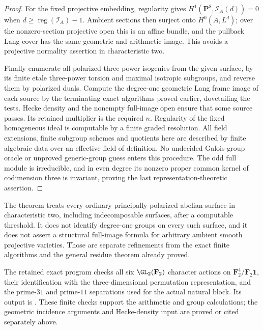 \begin{proof}
For the fixed projective embedding, regularity gives
$H^1(\mathbf P^8,\mathcal I_A(d))=0$ when
$d\ge\operatorname{reg}(\mathcal I_A)-1$.
Ambient sections then surject onto $H^0(A,L^d)$; over the nonzero-section
projective open this is an affine bundle, and the pullback Lang cover
has the same geometric and arithmetic image. This avoids a projective
normality assertion in characteristic two.

Finally enumerate all polarized three-power isogenies from the given
surface, by its finite etale three-power torsion and maximal isotropic
subgroups, and reverse them by polarized duals. Compute the degree-one
geometric Lang frame image of each source by the terminating exact
algorithms proved earlier, dovetailing the tests. Hecke density and the
nonempty full-image open ensure that some source passes. Its retained
multiplier is the required $n$. Regularity of the fixed homogeneous ideal
is computable by a finite graded resolution. All field extensions,
finite subgroup schemes and quotients here are described by finite
algebraic data over an effective field of definition. No undecided
Galois-group oracle or unproved generic-group guess enters this procedure.
The odd full module is irreducible, and in even degree its nonzero proper
common kernel of codimension three is invariant, proving the last
representation-theoretic assertion.
\end{proof}

\begin{remark}
The theorem treats every ordinary principally polarized abelian surface in
characteristic two, including indecomposable surfaces, after a computable
threshold. It does not identify degree-one groups on every such surface,
and it does not assert a structural full-image formula for arbitrary
ambient smooth projective varieties. Those are separate refinements from
the exact finite algorithms and the general residue theorem already proved.
\end{remark}

\begin{remark}
The retained exact program
checks all six $\GL_2(\mathbf F_2)$ character actions on
$\mathbf F_2^4/\mathbf F_2\mathbf1$, their identification with the
three-dimensional permutation representation, and the prime-$31$ and
prime-$11$ separations used for the actual natural block. Its output is
.
These finite checks support the arithmetic and group calculations; the
geometric incidence arguments and Hecke-density input are proved or cited
separately above.
\end{remark}
